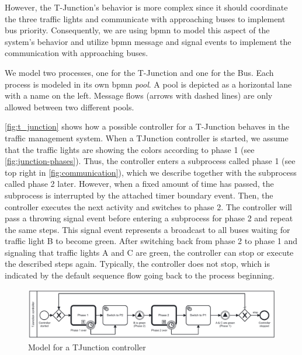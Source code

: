 \documentclass{jot}
\begin{document}
However, the T-Junction's behavior is more complex since it should coordinate the three traffic lights and communicate with approaching buses to implement bus priority.
Consequently, we are using \gls*{bpmn} to model this aspect of the system's behavior and utilize \gls*{bpmn} message and signal events to implement the communication with approaching buses.

We model two processes, one for the T-Junction and one for the Bus.
Each process is modeled in its own \gls*{bpmn} \emph{pool}.
A pool is depicted as a horizontal lane with a name on the left.
Message flows (arrows with dashed lines) are only allowed between two different pools.

\autoref{fig:t_junction} shows how a possible controller for a T-Junction behaves in the traffic management system.
When a TJunction controller is started, we assume that the traffic lights are showing the colors according to phase 1 (see \cref{fig:junction-phases}).
Thus, the controller enters a subprocess called phase 1 (see top right in \cref{fig:communication}), which we describe together with the subprocess called phase 2 later.
However, when a fixed amount of time has passed, the subprocess is interrupted by the attached timer boundary event.
Then, the controller executes the next activity and switches to phase 2.
The controller will pass a throwing signal event before entering a subprocess for phase 2 and repeat the same steps.
This signal event represents a broadcast to all buses waiting for traffic light B to become green.
After switching back from phase 2 to phase 1 and signaling that traffic lights A and C are green, the controller can stop or execute the described steps again.
Typically, the controller does not stop, which is indicated by the default sequence flow going back to the process beginning.

\begin{figure}[h]
    \centering
    \includegraphics[width=1\textwidth]{figures/t-junction.pdf}
    \caption{Model for a TJunction controller}
    \label{fig:t_junction}
\end{figure}
\end{document}
